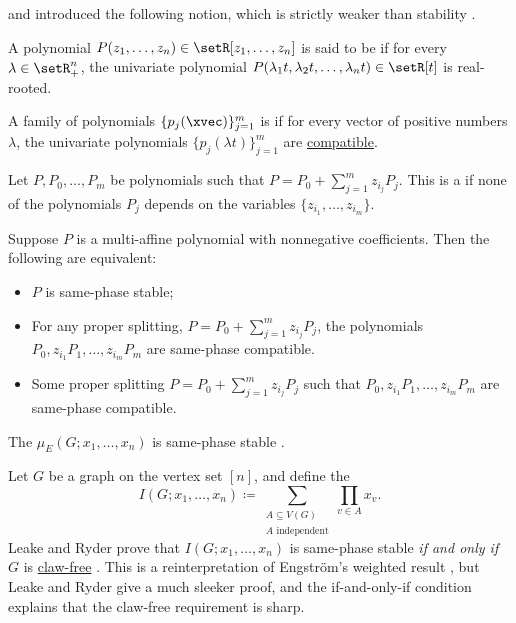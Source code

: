  and  introduced the following
notion, which is strictly weaker than stability \cite{LeakeRyder2019}.

\begin{definition}
 A polynomial $P(z_1,\dotsc,z_n) \in \setR[z_1,\dotsc,z_n]$ is said
 to be \label{samePhaseStabilityDefinition}
 if for every $\lambda \in \setR_+^n$, the univariate polynomial
 $P(\lambda_1 t,\lambda_2 t,\dotsc,\lambda_n t) \in \setR[t]$ is real-rooted.
\end{definition}

A family of polynomials $\{p_j(\xvec) \}_{j=1}^m$ is
\label{samePhaseCompatible}
if for every vector of positive numbers $\lambda$, the univariate polynomials
$\{p_j(\lambda t) \}_{j=1}^m$ are
\hyperref[compatiblePolynomials]{compatible}.


Let $P, P_0, \dotsc, P_m$ be polynomials such that
$P = P_0 + \sum_{j=1}^m z_{i_j} P_{j}$.
This is a \label{properSplitting}
if none of the polynomials $P_j$ depends on the variables
$\{z_{i_1}, \dotsc, z_{i_m} \}$.


\begin{theorem}
Suppose $P$ is a multi-affine polynomial with nonnegative coefficients.
Then the following are equivalent:
\begin{itemize}
\item $P$ is same-phase stable;
\item For any proper splitting,
$P = P_0 + \sum_{j=1}^m z_{i_j} P_{j}$,
the polynomials $P_0, z_{i_1} P_{1}, \dotsc, z_{i_m} P_{m}$
are same-phase compatible.

\item Some proper splitting
$P = P_0 + \sum_{j=1}^m z_{i_j} P_{j}$
such that $P_0, z_{i_1} P_{1}, \dotsc, z_{i_m} P_{m}$ are same-phase
compatible.

\end{itemize}

\end{theorem}


The 
\label{multiAffineEdgeMatchingPolynomial}
$\mu_E(G;x_1,\dotsc,x_n)$ is same-phase stable \cite[Cor. 3.2]{LeakeRyder2019}.

Let $G$ be a graph on the vertex set $[n]$, and define the
\label{multivariateIndependencePolynomial}
\[
I(G;x_1,\dotsc,x_n)
\coloneqq
\sum_{\substack{A \subseteq V(G) \\ A \text{ independent}}}
\prod_{v \in A} x_v.
\]
Leake and Ryder prove that $I(G;x_1,\dotsc,x_n)$ is same-phase stable
\emph{if and only if} $G$ is \hyperref[clawFreeGraph]{claw-free}
\cite{LeakeRyder2019}.
This is a reinterpretation of Engström's weighted result \cite{Engstrom2007},
but Leake and Ryder give a much sleeker proof, and the if-and-only-if
condition explains
that the claw-free requirement is sharp.


